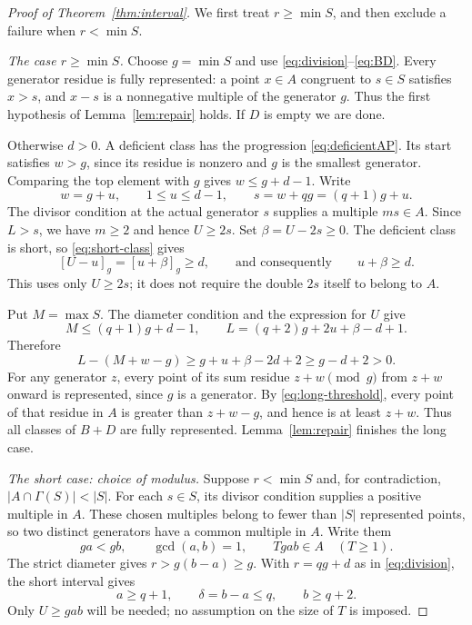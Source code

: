 \documentclass[11pt]{article}
\theoremstyle{definition}
\theoremstyle{remark}
\newcommand{\Ga}{\Gamma}
\begin{document}
\begin{proof}[Proof of Theorem~\ref{thm:interval}]
We first treat $r\geq\min S$, and then exclude a failure when
$r<\min S$.

\medskip
\noindent\emph{The case $r\geq\min S$.}
Choose $g=\min S$ and use \eqref{eq:division}--\eqref{eq:BD}. Every
generator residue is fully represented: a point $x\in A$ congruent
to $s\in S$ satisfies $x>s$, and $x-s$ is a nonnegative multiple of
the generator $g$. Thus the first hypothesis of
Lemma~\ref{lem:repair} holds. If $D$ is empty we are done.

Otherwise $d>0$. A deficient class has the progression
\eqref{eq:deficientAP}. Its start satisfies $w>g$, since its residue
is nonzero and $g$ is the smallest generator. Comparing the top element
with $g$ gives $w\leq g+d-1$. Write
\[
 w=g+u,\qquad 1\leq u\leq d-1,\qquad
 s=w+qg=(q+1)g+u.
\]
The divisor condition at the actual generator $s$ supplies a multiple
$ms\in A$. Since $L>s$, we have $m\geq2$ and hence $U\geq2s$.
Set $\beta=U-2s\geq0$. The deficient class is short, so
\eqref{eq:short-class} gives
\[
 [U-u]_g=[u+\beta]_g\geq d,
 \qquad\text{and consequently}\qquad u+\beta\geq d.
\]
This uses only $U\geq2s$; it does not require the double $2s$ itself
to belong to $A$.

Put $M=\max S$. The diameter condition and the expression for $U$ give
\[
 M\leq(q+1)g+d-1,\qquad
 L=(q+2)g+2u+\beta-d+1.
\]
Therefore
\begin{equation}\label{eq:long-threshold}
 L-(M+w-g)\geq g+u+\beta-2d+2\geq g-d+2>0.
\end{equation}
For any generator $z$, every point of its sum residue $z+w\pmod g$
from $z+w$ onward is represented, since $g$ is a generator.
By \eqref{eq:long-threshold}, every point of that residue in $A$ is
greater than $z+w-g$, and hence is at least $z+w$. Thus all classes
of $B+D$ are fully represented. Lemma~\ref{lem:repair} finishes the
long case.

\medskip
\noindent\emph{The short case: choice of modulus.}
Suppose $r<\min S$ and, for contradiction, $|A\cap\Ga(S)|<|S|$.
For each $s\in S$, its divisor condition supplies a positive multiple
in $A$. These chosen multiples belong to fewer than $|S|$ represented
points, so two distinct generators have a common multiple in $A$.
Write them
\[
 ga<gb,\qquad \gcd(a,b)=1,\qquad Tgab\in A\quad(T\geq1).
\]
The strict diameter gives $r>g(b-a)\geq g$. With
$r=qg+d$ as in \eqref{eq:division}, the short interval gives
\begin{equation}\label{eq:short-parameters}
 a\geq q+1,\qquad \delta=b-a\leq q,\qquad b\geq q+2.
\end{equation}
Only $U\geq gab$ will be needed; no assumption on the size of $T$
is imposed.


\end{proof}
\end{document}
